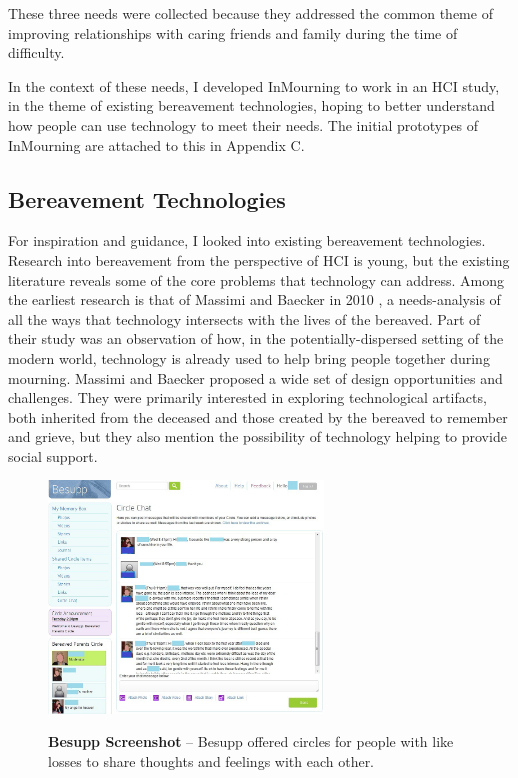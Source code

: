   These three needs were collected because they addressed the common theme of improving
  relationships with caring friends and family during the time of difficulty.

  In the context of these needs, I developed InMourning to work in an HCI study,
  in the theme of existing bereavement technologies,
  hoping to better understand how people can use technology to meet their needs.
  The initial prototypes of InMourning are attached to this in Appendix C.

  \subsection{Bereavement Technologies}
    For inspiration and guidance, I looked into existing bereavement technologies.
    Research into bereavement from the perspective of HCI is young, but the
    existing literature reveals some of the core problems that technology can
    address. Among the earliest research is that of Massimi and Baecker in 2010
    \cite{mm10},
    a needs-analysis of all the ways that technology intersects with the lives of
    the bereaved.
    Part of their study was an observation of how,
    in the potentially-dispersed setting of the modern world, 
    technology is already used to help bring people together during mourning.
    Massimi and Baecker proposed a wide set of design opportunities and challenges.
    They were primarily interested in exploring technological artifacts,
    both inherited from the deceased and those created by the bereaved to
    remember and grieve, but they also mention the possibility of technology
    helping to provide social support.

  \begin{figure}
  \caption{\textbf{Besupp Screenshot} --
  Besupp offered circles for people with like losses to share thoughts
  and feelings with each other.
  }
  \centering
  \includegraphics[width=0.65\textwidth]{besupp.png}
  \label{fig:besupp}
  \end{figure}

